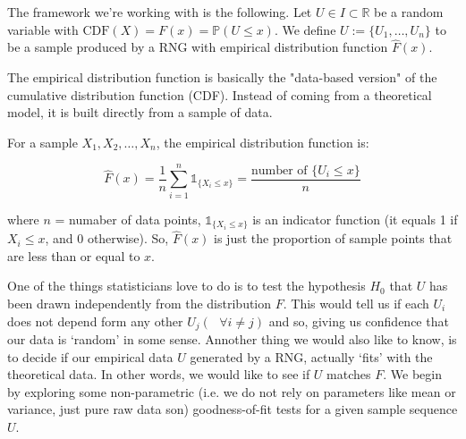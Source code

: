 \vspace{0.2cm}

The framework we're working with is the following. Let $U \in I \subset \mathbb{R}$ be a random variable with $\text{CDF}(X) = F(x) = \mathbb{P}(U \leq x)$. We define $U := \{U_1, \ldots, U_n\}$
to be a sample produced by a RNG with empirical distribution function $\hat{F}(x)$.  

\begin{remark}
    The empirical distribution function is basically the "data-based version" 
of the cumulative distribution function (CDF). Instead of coming from a 
theoretical model, it is built directly from a sample of data.

For a sample \(X_1, X_2, \ldots, X_n\), the empirical distribution function is:

\[
\hat{F}(x) = \frac{1}{n} \sum_{i=1}^{n} \mathds{1}_{\{X_i \leq x\}} = \frac{\text{number of } \{U_i \leq x\}}{n}
\]

where \(n\) = numaber of data points, \(\mathds{1}_{\{X_i \leq x\}}\) is an indicator function (it equals 1 if 
\(X_i \leq x\), and 0 otherwise). So, \(\hat{F}(x)\) is just the proportion of sample points that are 
less than or equal to \(x\).  
\end{remark}

\vspace{0.2cm}

One of the things statisticians love to do is to test the hypothesis $H_0$ that $U$ has been drawn independently from the distribution $F$. This would tell us if
each $U_i$ does not depend form any other $U_j (\text{ }\forall i \neq j)$ and so, giving us confidence that our data is `random' in some sense. Annother thing we would also like to know, is to decide if our empirical data $U$ generated by a RNG, actually `fits' with the theoretical data. In other words,
we would like to see if $U$ matches $F$. We begin by exploring some non-parametric (i.e. we do not rely on parameters like mean or variance, just pure raw data son) goodness-of-fit tests for a given sample sequence $U$.

